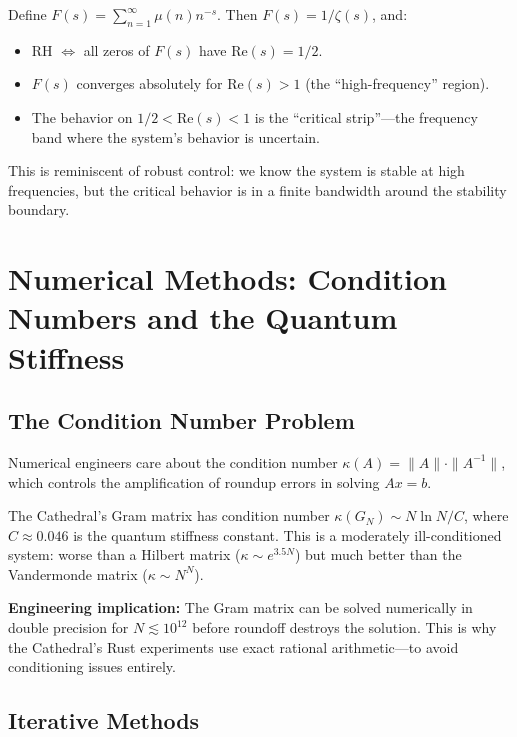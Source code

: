 \documentclass[11pt,a4paper]{article}
\newcommand{\RH}{\ensuremath{\mathrm{RH}}}
\begin{document}
Define $F(s) = \sum_{n=1}^{\infty} \mu(n) n^{-s}$. Then
$F(s) = 1/\zeta(s)$, and:
\begin{itemize}
  \item \RH{} $\iff$ all zeros of $F(s)$ have $\mathrm{Re}(s) = 1/2$.
  \item $F(s)$ converges absolutely for $\mathrm{Re}(s) > 1$ (the
    ``high-frequency'' region).
  \item The behavior on $1/2 < \mathrm{Re}(s) < 1$ is the ``critical
    strip''---the frequency band where the system's behavior is
    uncertain.
\end{itemize}

This is reminiscent of robust control: we know the system is stable
at high frequencies, but the critical behavior is in a finite
bandwidth around the stability boundary.

\section{Numerical Methods: Condition Numbers and the Quantum Stiffness}
\label{sec:numerical}

\subsection{The Condition Number Problem}

Numerical engineers care about the condition number
$\kappa(A) = \|A\| \cdot \|A^{-1}\|$, which controls the
amplification of roundup errors in solving $Ax = b$.

The Cathedral's Gram matrix has condition number
$\kappa(G_N) \sim N \ln N / C$, where $C \approx 0.046$ is the
quantum stiffness constant. This is a moderately ill-conditioned
system: worse than a Hilbert matrix ($\kappa \sim e^{3.5N}$) but
much better than the Vandermonde matrix ($\kappa \sim N^N$).

\textbf{Engineering implication:} The Gram matrix can be solved
numerically in double precision for $N \lesssim 10^{12}$ before
roundoff destroys the solution. This is why the Cathedral's Rust
experiments use exact rational arithmetic---to avoid conditioning
issues entirely.

\subsection{Iterative Methods}
\end{document}
